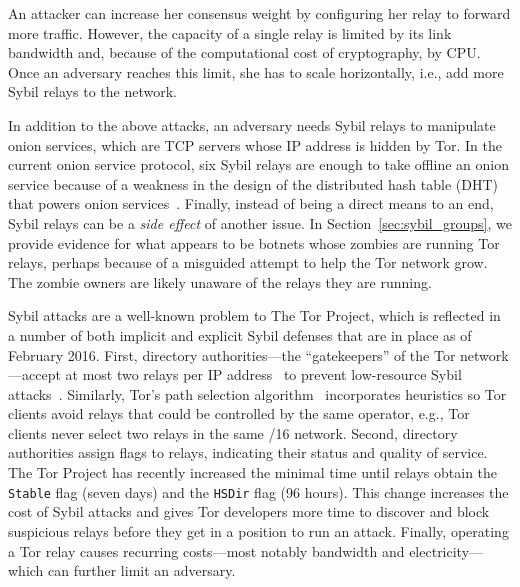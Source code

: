 An attacker can increase her consensus weight by configuring her relay to
forward more traffic.  However, the capacity of a single relay is limited by its
link bandwidth and, because of the computational cost of cryptography, by CPU.
Once an adversary reaches this limit, she has to scale horizontally, i.e., add
more Sybil relays to the network.

In addition to the above attacks, an adversary needs Sybil relays to manipulate
onion services, which are TCP servers whose IP address is hidden by Tor.  In the
current onion service protocol, six Sybil relays are enough to take offline
an onion service because of a weakness in the design of the distributed hash
table (DHT) that powers onion services~\cite{Biryukov2013a}.  Finally, instead
of being a direct means to an end, Sybil relays can be a \emph{side effect} of
another issue.  In Section~\ref{sec:sybil_groups}, we provide evidence for what
appears to be botnets whose zombies are running Tor relays, perhaps because of a
misguided attempt to help the Tor network grow.  The zombie owners are likely
unaware of the relays they are running.

Sybil attacks are a well-known problem to The Tor Project, which is reflected in
a number of both implicit and explicit Sybil defenses that are in place as of
February 2016.  First, directory authorities---the ``gatekeepers'' of the Tor
network---accept at most two relays per IP address~\cite{Bauer2007b} to prevent
low-resource Sybil attacks~\cite{Bauer2007a}.  Similarly, Tor's path selection
algorithm~\cite{path-spec} incorporates heuristics so Tor clients avoid relays
that could be controlled by the same operator, e.g., Tor clients never select
two relays in the same /16 network.  Second, directory authorities assign flags
to relays, indicating their status and quality of service.  The Tor Project has
recently increased the minimal time until relays obtain the \texttt{Stable} flag
(seven days) and the \texttt{HSDir} flag (96 hours).  This change increases the
cost of Sybil attacks and gives Tor developers more time to discover and block
suspicious relays before they get in a position to run an attack.  Finally,
operating a Tor relay causes recurring costs---most notably bandwidth and
electricity---which can further limit an adversary.

